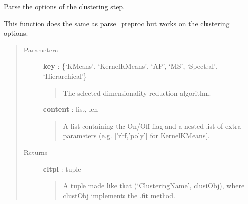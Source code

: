 \documentclass[letterpaper,10pt,english]{sphinxmanual}
\begin{document}
\begin{fulllineitems}
\label{index:adenine.core.define_pipeline.parse_clustering}
Parse the options of the clustering step.

This function does the same as parse\_preproc but works on the clustering options.
\begin{quote}\begin{description}
\item[{Parameters}] \leavevmode
\textbf{key} : \{`KMeans', `KernelKMeans', `AP', `MS', `Spectral', `Hierarchical'\}
\begin{quote}

The selected dimensionality reduction algorithm.
\end{quote}

\textbf{content} : list, len
\begin{quote}

A list containing the On/Off flag and a nested list of extra parameters (e.g. {[}'rbf,'poly'{]} for KernelKMeans).
\end{quote}

\item[{Returns}] \leavevmode
\textbf{cltpl} : tuple
\begin{quote}

A tuple made like that (`ClusteringName', clustObj), where clustObj implements the .fit method.
\end{quote}

\end{description}\end{quote}

\end{fulllineitems}

\end{document}
